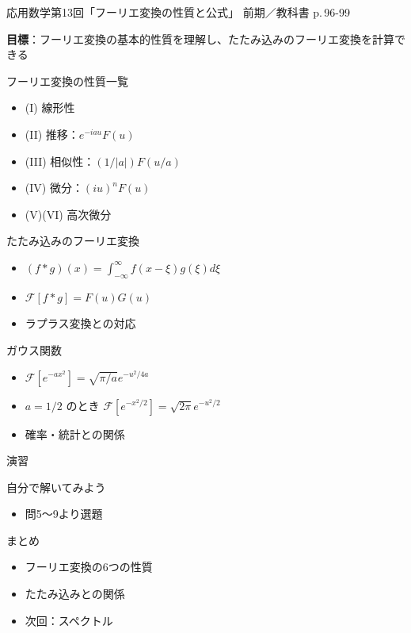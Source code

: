 \documentclass[aspectratio=43,professionalfonts,handout]{beamer}
\newcommand{\LectureNum}{13}
\newcommand{\LectureTitle}{フーリエ変換の性質と公式}
\newcommand{\TextPages}{p.\,96-99}
\newcommand{\CourseName}{応用数学}
\renewcommand{\TermName}{前期}
\begin{document}
\begin{frame}{\CourseName\quad 第\LectureNum 回「\LectureTitle」}
  {\small \TermName\quad \TeacherName\quad ／\quad 教科書 \TextPages}

  \textbf{目標}：フーリエ変換の基本的性質を理解し、たたみ込みのフーリエ変換を計算できる

\end{frame}

\begin{frame}{フーリエ変換の性質一覧}
  \begin{block}{}
  \begin{itemize}
    \item (I) 線形性
    \item (II) 推移：$e^{-iau}F(u)$
    \item (III) 相似性：$(1/|a|)F(u/a)$
    \item (IV) 微分：$(iu)^n F(u)$
    \item (V)(VI) 高次微分
  \end{itemize}
  \end{block}
\end{frame}

\begin{frame}{たたみ込みのフーリエ変換}
  \begin{block}{}
  \begin{itemize}
    \item $(f*g)(x) = \int_{-\infty}^{\infty} f(x-\xi)g(\xi)d\xi$
    \item $\mathcal{F}[f*g] = F(u)G(u)$
    \item ラプラス変換との対応
  \end{itemize}
  \end{block}
\end{frame}

\begin{frame}{ガウス関数}
  \begin{block}{}
  \begin{itemize}
    \item $\mathcal{F}[e^{-ax^{2}}] = \sqrt{\pi/a}e^{-u^{2}/4a}$
    \item $a=1/2$ のとき $\mathcal{F}[e^{-x^{2}/2}] = \sqrt{2\pi}e^{-u^{2}/2}$
    \item 確率・統計との関係
  \end{itemize}
  \end{block}
\end{frame}

\begin{frame}{演習}
  \begin{exampleblock}{自分で解いてみよう}
  \begin{itemize}
    \item 問5〜9より選題
  \end{itemize}
  \end{exampleblock}
\end{frame}

\begin{frame}{まとめ}
  \begin{itemize}
    \item フーリエ変換の6つの性質
    \item たたみ込みとの関係
    \item 次回：スペクトル
  \end{itemize}
\end{frame}
\end{document}
